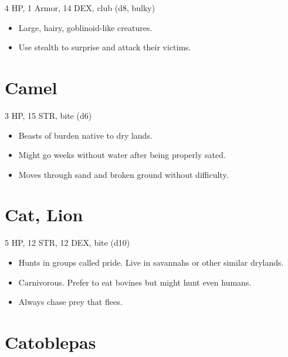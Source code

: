 \documentclass[
  10pt,
  american,
]{article}
\begin{document}
4 HP, 1 Armor, 14 DEX, club (d8, bulky)

\begin{samepage}
\begin{itemize}
\setlength\itemsep{-.5em}
\item Large, hairy, goblinoid-like creatures.
\item Use stealth to surprise and attack their victims.
\end{itemize}
\end{samepage}

\hypertarget{camel}{%
\section{Camel}\label{camel}}

3 HP, 15 STR, bite (d6)

\begin{samepage}
\begin{itemize}
\setlength\itemsep{-.5em}
\item Beasts of burden native to dry lands.
\item Might go weeks without water after being properly sated.
\item Moves through sand and broken ground without difficulty.
\end{itemize}
\end{samepage}

\hypertarget{cat-lion}{%
\section{Cat, Lion}\label{cat-lion}}

5 HP, 12 STR, 12 DEX, bite (d10)

\begin{samepage}
\begin{itemize}
\setlength\itemsep{-.5em}
\item Hunts in groups called pride. Live in savannahs or other similar drylands.
\item Carnivorous. Prefer to eat bovines but might hunt even humans.
\item Always chase prey that flees.
\end{itemize}
\end{samepage}

\hypertarget{catoblepas}{%
\section{Catoblepas}\label{catoblepas}}
\end{document}
